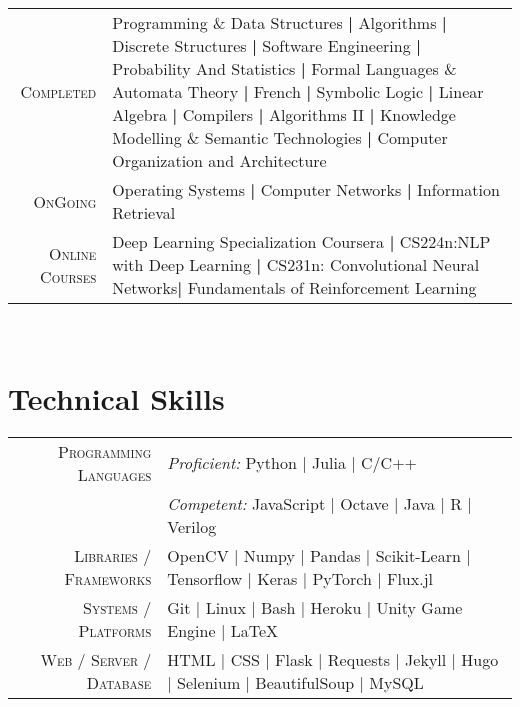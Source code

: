 \documentclass[a4paper,10pt]{extarticle} %
\begin{document}
\begin{tabular}{r|p{15.55cm}}
\textsc{Completed} & Programming \& Data Structures \textbf{|} Algorithms \textbf{|} Discrete Structures \textbf{|}  Software Engineering \textbf{|} Probability And Statistics \textbf{|} Formal Languages \& Automata Theory \textbf{|} French \textbf{|} Symbolic Logic \textbf{|} Linear Algebra  \textbf{|} Compilers \textbf{|} Algorithms II \textbf{|} Knowledge Modelling \& Semantic Technologies \textbf{|}  Computer Organization and Architecture\\
\textsc{OnGoing} & Operating Systems \textbf{|} Computer Networks \textbf{|} Information Retrieval \\
\textsc{Online Courses} & Deep Learning Specialization Coursera \textbf{|} CS224n:NLP with Deep Learning \textbf{|} CS231n: Convolutional Neural Networks\textbf{|} Fundamentals of Reinforcement Learning \\
\end{tabular}
\\

\section{\textcolor{primary}{Technical Skills}}

\begin{tabular}{r|p{15cm}}
\textsc{Programming Languages} & \textit{Proficient:} Python | Julia | C/C++ \\
                               & \textit{Competent:} JavaScript | Octave | Java | R | Verilog\\
\textsc{Libraries / Frameworks} & OpenCV | Numpy | Pandas | Scikit-Learn | Tensorflow | Keras | PyTorch | Flux.jl \\
\textsc{Systems / Platforms} & Git | Linux | Bash | Heroku | Unity Game Engine | \LaTeX\\
\textsc{Web / Server / Database} & HTML | CSS | Flask | Requests | Jekyll | Hugo | Selenium | BeautifulSoup | MySQL \\
\end{tabular}
\\
\\
\vspace{-0.3cm}
\end{document}
